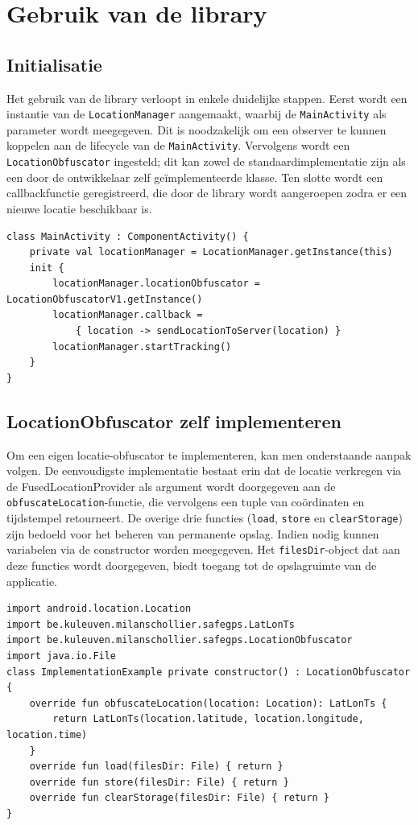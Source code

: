 \section{Gebruik van de library}
\subsection{Initialisatie}
Het gebruik van de library verloopt in enkele duidelijke stappen. Eerst wordt een instantie van de \texttt{LocationManager} aangemaakt, waarbij de \texttt{MainActivity} als parameter wordt meegegeven. Dit is noodzakelijk om een observer te kunnen koppelen aan de lifecycle van de \texttt{MainActivity}. Vervolgens wordt een \texttt{LocationObfuscator} ingesteld; dit kan zowel de standaardimplementatie zijn als een door de ontwikkelaar zelf geïmplementeerde klasse. Ten slotte wordt een callbackfunctie geregistreerd, die door de library wordt aangeroepen zodra er een nieuwe locatie beschikbaar is.
\begin{verbatim}
class MainActivity : ComponentActivity() {
    private val locationManager = LocationManager.getInstance(this)
    init {
        locationManager.locationObfuscator = LocationObfuscatorV1.getInstance()
        locationManager.callback =
            { location -> sendLocationToServer(location) }
        locationManager.startTracking()
    }
}
\end{verbatim}

\subsection{LocationObfuscator zelf implementeren}
Om een eigen locatie-obfuscator te implementeren, kan men onderstaande aanpak volgen. De eenvoudigste implementatie bestaat erin dat de locatie verkregen via de FusedLocationProvider als argument wordt doorgegeven aan de \texttt{obfuscateLocation}-functie, die vervolgens een tuple van coördinaten en tijdstempel retourneert. De overige drie functies (\texttt{load}, \texttt{store} en \texttt{clearStorage}) zijn bedoeld voor het beheren van permanente opslag. Indien nodig kunnen variabelen via de constructor worden meegegeven. Het \texttt{filesDir}-object dat aan deze functies wordt doorgegeven, biedt toegang tot de opslagruimte van de applicatie.
\begin{verbatim}
import android.location.Location
import be.kuleuven.milanschollier.safegps.LatLonTs
import be.kuleuven.milanschollier.safegps.LocationObfuscator
import java.io.File
class ImplementationExample private constructor() : LocationObfuscator {
    override fun obfuscateLocation(location: Location): LatLonTs {
        return LatLonTs(location.latitude, location.longitude, location.time)
    }
    override fun load(filesDir: File) { return }
    override fun store(filesDir: File) { return }
    override fun clearStorage(filesDir: File) { return }
}
\end{verbatim}

